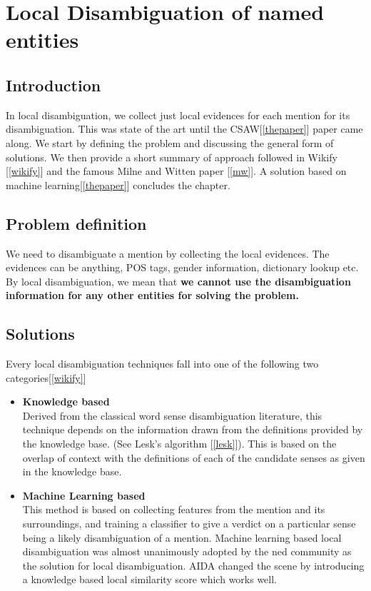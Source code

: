 \chapter{Local Disambiguation of named entities}
\section{Introduction}
In local disambiguation, we collect just local evidences for each 
mention for its disambiguation. This was state of the art until the CSAW[\ref{thepaper}]
paper came along. We start by defining the problem and discussing the general form of solutions.
We then provide a short summary of approach followed in Wikify [\ref{wikify}] and the famous Milne and Witten paper [\ref{mw}]. A
solution based on machine learning[\ref{thepaper}] concludes the chapter.

\section{Problem definition}
We need to disambiguate a mention by collecting the local evidences. 
The evidences can be anything, POS tags, gender information, dictionary lookup 
etc. By local disambiguation, we mean that \textbf{we cannot use the disambiguation
information for any other entities for solving the problem.} 

\section{Solutions}

Every local disambiguation techniques fall into one of the following two categories[\ref{wikify}]

\begin{itemize}
 \item \textbf{Knowledge based} \\
 Derived from the classical word sense disambiguation literature, this 
 technique depends on the information drawn from the definitions provided by the knowledge base. 
 (See Lesk's algorithm [\ref{lesk}]).
 This is based on the overlap of context with the definitions of each of the candidate 
 senses as given in the knowledge base.
 
 \item \textbf{Machine Learning based} \\
 This method is based on collecting features from the mention and its surroundings, and
 training a classifier to give a verdict on a particular sense being a likely disambiguation
 of a mention. Machine learning based local disambiguation was almost unanimously adopted
 by the ned community as the solution for local disambiguation. AIDA changed the scene 
 by introducing a knowledge based local similarity score which works well.
 
 \end{itemize}

